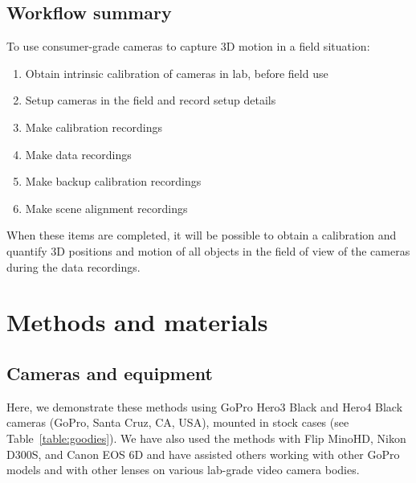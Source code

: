 \documentclass[fleqn,10pt]{wlpeerj}
\begin{document}
\subsection*{Workflow summary}

To use consumer-grade cameras to capture 3D motion in a field situation:
\begin{enumerate}
\item{Obtain intrinsic calibration of cameras in lab, before field use}
\item{Setup cameras in the field and record setup details}
\item{Make calibration recordings}
\item{Make data recordings}
\item{Make backup calibration recordings}
\item{Make scene alignment recordings}
\end{enumerate}

When these items are completed, it will be possible to obtain a calibration and quantify 3D positions and motion of all objects in the field of view of the cameras during the data recordings.  







\section*{Methods and materials}
\subsection*{Cameras and equipment}
Here, we demonstrate these methods using GoPro Hero3 Black and Hero4 Black cameras (GoPro, Santa Cruz, CA, USA), mounted in stock cases (see Table~\ref{table:goodies}).  We have also used the methods with Flip MinoHD, Nikon D300S, and Canon EOS 6D and have assisted others working with other GoPro models and with other lenses on various lab-grade video camera bodies.
\end{document}
